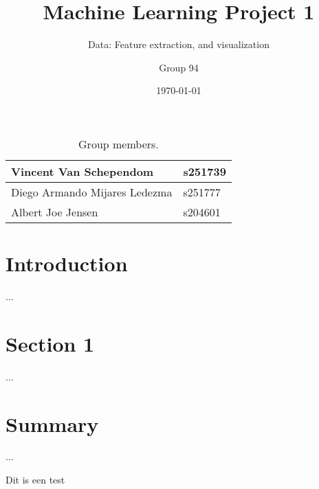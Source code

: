\documentclass[dtu]{dtuarticle}
\title{Machine Learning Project 1}
\subtitle{Data: Feature extraction, and visualization}
\author{Group 94}
\date{\today}
\begin{document}
	\maketitle

	\begin{table}[h!]
		\centering
		\begin{tabular}{l | l}
			Vincent Van Schependom & s251739 \\ \hline
			Diego Armando Mijares Ledezma & s251777 \\ \hline
			Albert Joe Jensen & s204601
		\end{tabular}
		\caption{Group members.}
	\end{table}

	\section*{Introduction}

	...

	\section{Section 1}

	...

	\section*{Summary}

	...

	\newpage

	Dit is een test
\end{document}
